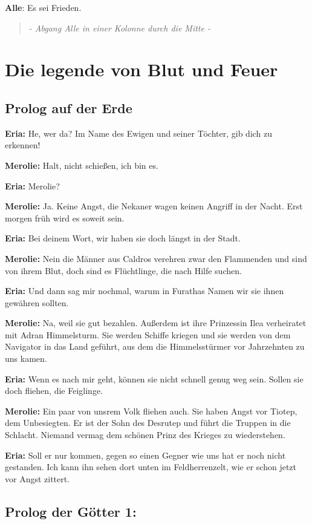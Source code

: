 \documentclass[a5paper,6pt]{book}
\begin{document}
\textbf{Alle}: Es sei Frieden.

\begin{quote}
  \textit{- Abgang Alle in einer Kolonne durch die Mitte -
}
 \end{quote}


\chapter{Die legende von Blut und Feuer}

\section{Prolog auf der Erde}

\textbf{Eria:} He, wer da? Im Name des Ewigen und seiner Töchter, gib dich zu erkennen!

\textbf{Merolie:} Halt, nicht schießen, ich bin es.

\textbf{Eria:} Merolie?

\textbf{Merolie:} Ja. Keine Angst, die Nekaner wagen keinen Angriff in der Nacht. Erst morgen früh
wird es soweit sein.

\textbf{Eria:} Bei deinem Wort, wir haben sie doch längst in der Stadt.

\textbf{Merolie:} Nein die Männer aus Caldros verehren zwar den Flammenden und sind von ihrem
Blut, doch sind es Flüchtlinge, die nach Hilfe suchen.

\textbf{Eria:} Und dann sag mir nochmal, warum in Furathas Namen wir sie ihnen gewähren sollten.

\textbf{Merolie:} Na, weil sie gut bezahlen. Außerdem ist ihre Prinzessin Ilea verheiratet mit Adran
Himmelsturm. Sie werden Schiffe kriegen und sie werden von dem Navigator in das
Land geführt, aus dem die Himmelsstürmer vor Jahrzehnten zu uns kamen.

\textbf{Eria:} Wenn es nach mir geht, können sie nicht schnell genug weg sein. Sollen sie doch
fliehen, die Feiglinge.

\textbf{Merolie:} Ein paar von unsrem Volk fliehen auch. Sie haben Angst vor Tiotep, dem
Unbesiegten. Er ist der Sohn des Desrutep und führt die Truppen in die Schlacht.
Niemand vermag dem schönen Prinz des Krieges zu wiederstehen.

\textbf{Eria:} Soll er nur kommen, gegen so einen Gegner wie uns hat er noch nicht gestanden. Ich
kann ihn sehen dort unten im Feldherrenzelt, wie er schon jetzt vor Angst zittert.

\section{Prolog der Götter 1:}
\end{document}
